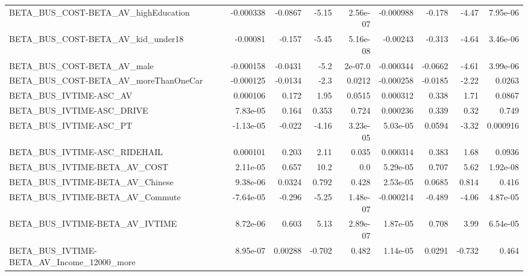 \begin{tabular}{lrrrrrrrr}
BETA\_BUS\_COST-BETA\_AV\_highEducation                &   -0.000338 &      -0.0867 &    -5.15 & 2.56e-07 &  -0.000988 &      -0.178 &        -4.47 &      7.95e-06 \\
BETA\_BUS\_COST-BETA\_AV\_kid\_under18                  &    -0.00081 &       -0.157 &    -5.45 & 5.16e-08 &   -0.00243 &      -0.313 &        -4.64 &      3.46e-06 \\
BETA\_BUS\_COST-BETA\_AV\_male                         &   -0.000158 &      -0.0431 &     -5.2 &  2e-07.0 &  -0.000344 &     -0.0662 &        -4.61 &      3.99e-06 \\
BETA\_BUS\_COST-BETA\_AV\_moreThanOneCar               &   -0.000125 &      -0.0134 &     -2.3 &   0.0212 &  -0.000258 &     -0.0185 &        -2.22 &        0.0263 \\
BETA\_BUS\_IVTIME-ASC\_AV                             &    0.000106 &        0.172 &     1.95 &   0.0515 &   0.000312 &       0.338 &         1.71 &        0.0867 \\
BETA\_BUS\_IVTIME-ASC\_DRIVE                          &    7.83e-05 &        0.164 &    0.353 &    0.724 &   0.000236 &       0.339 &         0.32 &         0.749 \\
BETA\_BUS\_IVTIME-ASC\_PT                             &   -1.13e-05 &       -0.022 &    -4.16 & 3.23e-05 &   5.03e-05 &      0.0594 &        -3.32 &      0.000916 \\
BETA\_BUS\_IVTIME-ASC\_RIDEHAIL                       &    0.000101 &        0.203 &     2.11 &    0.035 &   0.000314 &       0.383 &         1.68 &        0.0936 \\
BETA\_BUS\_IVTIME-BETA\_AV\_COST                       &    2.11e-05 &        0.657 &     10.2 &      0.0 &   5.29e-05 &       0.707 &         5.62 &      1.92e-08 \\
BETA\_BUS\_IVTIME-BETA\_AV\_Chinese                    &    9.38e-06 &       0.0324 &    0.792 &    0.428 &   2.53e-05 &      0.0685 &        0.814 &         0.416 \\
BETA\_BUS\_IVTIME-BETA\_AV\_Commute                    &   -7.64e-05 &       -0.296 &    -5.25 & 1.48e-07 &  -0.000214 &      -0.489 &        -4.06 &      4.87e-05 \\
BETA\_BUS\_IVTIME-BETA\_AV\_IVTIME                     &    8.72e-06 &        0.603 &     5.13 & 2.89e-07 &   1.87e-05 &       0.708 &         3.99 &      6.54e-05 \\
BETA\_BUS\_IVTIME-BETA\_AV\_Income\_12000\_more          &    8.95e-07 &      0.00288 &   -0.702 &    0.482 &   1.14e-05 &      0.0291 &       -0.732 &         0.464 \\

\end{tabular}
